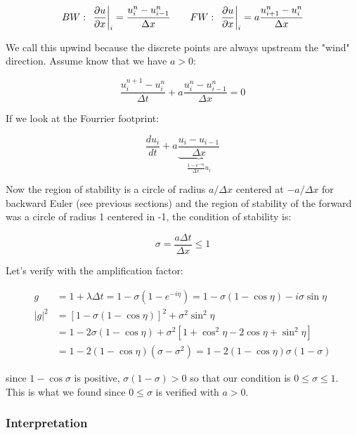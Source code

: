 \begin{equation}
BW : \ \left.\frac{\partial u}{\partial x} \right| _i = \frac{u_i ^n-u_{i-1}^n}{\Delta x} \qquad FW : \ \left.\frac{\partial u}{\partial x}\right| _i = a \frac{u_{i+1}^n - u_{i}^n}{\Delta x}
\end{equation}

We call this upwind because the discrete points are always upstream the "wind" direction. Assume know that we have $a>0$: 

\begin{equation}
\frac{u_{i}^{n+1} - u_{i}^{n}}{\Delta t} + a \frac{u_{i}^{n} - u_{i-1}^{n}}{\Delta x} = 0
\end{equation}

If we look at the Fourrier footprint: 

\begin{equation}
\frac{d u_i}{dt} + a \underbrace{\frac{u_{i}-u_{i-1}}{\Delta x}}_{\frac{1-e^{-i\eta}}{\Delta x}u_i}
\end{equation}

Now the region of stability is a circle of radius $a/\Delta x$ centered at $-a/\Delta x$ for backward Euler (see previous sections) and the region of stability of the forward was a circle of radius 1 centered in -1, the condition of stability is:

\begin{equation}
\sigma = \frac{a\Delta t}{\Delta x} \leq 1
\end{equation}

Let's verify with the amplification factor:

\begin{equation}
\begin{aligned}
g &= 1 + \lambda \Delta t = 1 - \sigma (1- e^{-i\eta}) = 1 - \sigma (1 - \cos \eta) - i \sigma \sin \eta \\
|g| ^2 &= [1 - \sigma (1 - \cos \eta)]^2 + \sigma ^2 \sin ^2 \eta\\
 &= 1 - 2\sigma (1 - \cos \eta) + \sigma ^2 [1 + \cos ^2 \eta - 2 \cos \eta + \sin ^2 \eta]\\
  &= 1 - 2 (1- \cos \eta) (\sigma - \sigma ^2) = 1 - 2 (1 - \cos \eta)\sigma (1 - \sigma) 
\end{aligned}
\end{equation}

since $1 - \cos \sigma $ is positive, $\sigma (1 - \sigma )> 0$ so that our condition is $0\leq \sigma \leq 1$. This is what we found since $0 \leq \sigma$ is verified with $a>0$.

\subsubsection{Interpretation}

